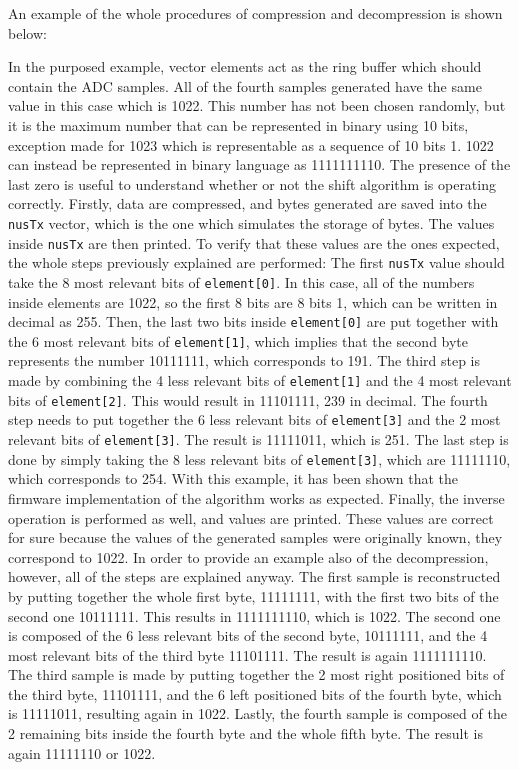 \documentclass{Configuration_Files/PoliMi3i_thesis}
\begin{document}
An example of the whole procedures of compression and decompression is shown below: 

In the purposed example, vector elements act as the ring buffer which should contain the ADC samples. All of the fourth samples generated have the same value in this case which is 1022. This number has not been chosen randomly, but it is the maximum number that can be represented in binary using 10 bits, exception made for 1023 which is representable as a sequence of 10 bits 1. 1022 can instead be represented in binary language as 1111111110. The presence of the last zero is useful to understand whether or not the shift algorithm is operating correctly. Firstly, data are compressed, and bytes generated are saved into the \texttt{nusTx} vector, which is the one which simulates the storage of bytes. The values inside \texttt{nusTx} are then printed. To verify that these values are the ones expected, the whole steps previously explained are performed:
The first \texttt{nusTx} value should take the 8 most relevant bits of \texttt{element[0]}. In this case, all of the numbers inside elements are 1022, so the first 8 bits are 8 bits 1, which can be written in decimal as 255.
Then, the last two bits inside \texttt{element[0]} are put together with the 6 most relevant bits of \texttt{element[1]}, which implies that the second byte represents the number 10111111, which corresponds to 191.
The third step is made by combining the 4 less relevant bits of \texttt{element[1]} and the 4 most relevant bits of \texttt{element[2]}. This would result in 11101111, 239 in decimal.
The fourth step needs to put together the 6 less relevant bits of \texttt{element[3]} and the 2 most relevant bits of \texttt{element[3]}. The result is 11111011, which is 251.
The last step is done by simply taking the 8 less relevant bits of \texttt{element[3]}, which are 11111110, which corresponds to 254.
With this example, it has been shown that the firmware implementation of the algorithm works as expected. Finally, the inverse operation is performed as well, and values are printed. These values are correct for sure because the values of the generated samples were originally known, they correspond to 1022. In order to provide an example also of the decompression, however, all of the steps are explained anyway.
The first sample is reconstructed by putting together the whole first byte, 11111111, with the first two bits of the second one 10111111. This results in 1111111110, which is 1022.
The second one is composed of the 6 less relevant bits of the second byte, 10111111, and the 4 most relevant bits of the third byte 11101111. The result is again 1111111110.
The third sample is made by putting together the 2 most right positioned bits of the third byte, 11101111, and the 6 left positioned bits of the fourth byte, which is 11111011, resulting again in 1022.
Lastly, the fourth sample is composed of the 2 remaining bits inside the fourth byte and the whole fifth byte. The result is again 11111110 or 1022.
\end{document}
